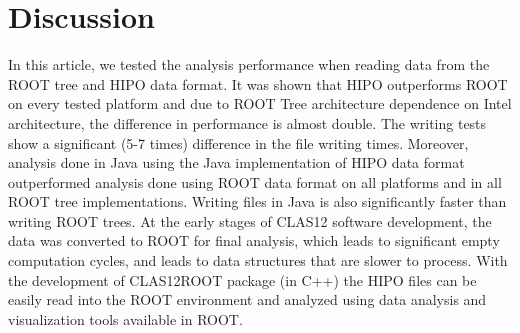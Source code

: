 \documentclass[preprint,12pt]{elsarticle}
\begin{document}

  

 \section{Discussion}
 
 In this article, we tested the analysis performance when reading data from the ROOT tree and HIPO data format. 
 It was shown that HIPO outperforms ROOT on every tested platform and due to ROOT Tree architecture dependence 
 on Intel architecture, the difference in performance is almost double. The writing tests show a significant (5-7 times) difference in the file writing times. 
 Moreover, analysis done in Java using the Java implementation of HIPO data format outperformed analysis done using ROOT data format on all platforms
 and in all ROOT tree implementations. Writing files in Java is also significantly faster than writing ROOT trees. 
 At the early stages of CLAS12 software development, the data was converted to ROOT for final analysis, which leads to significant 
 empty computation cycles, and leads to data structures that are slower to process. With the development of CLAS12ROOT package (in C++)
 the HIPO files can be easily read into the ROOT environment and analyzed using data analysis and visualization tools available in ROOT.
 
 
\newpage


\end{document}
